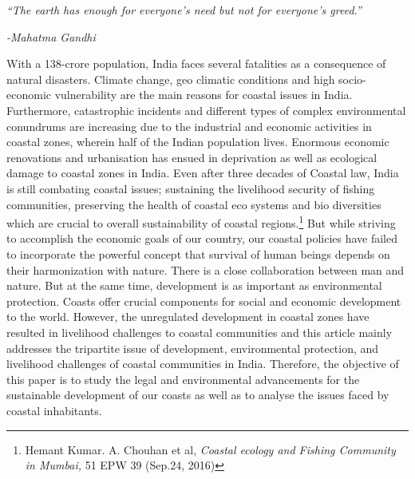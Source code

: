 \setcounter{figure}{0}
\setcounter{table}{0}
\setcounter{footnote}{0}



\begin{multicols}{2}

\noi
\textit{“The earth has enough for everyone’s need but not for everyone’s greed.”}
 
{\hfill\textit{-Mahatma Gandhi}}
 

\noi
With a 138-crore population, India faces several fatalities as a consequence of natural
disasters. Climate change, geo climatic conditions and high socio-economic vulnerability are
the main reasons for coastal issues in India. Furthermore, catastrophic incidents and different
types of complex environmental conundrums are increasing due to the industrial and
economic activities in coastal zones, wherein half of the Indian population lives. Enormous
economic renovations and urbanisation has ensued in deprivation as well as ecological
damage to coastal zones in India. Even after three decades of Coastal law, India is still
combating coastal issues; sustaining the livelihood security of fishing communities,
preserving the health of coastal eco systems and bio diversities which are crucial to overall
sustainability of coastal regions.\footnote{Hemant Kumar. A. Chouhan et al, \textit{Coastal ecology and Fishing Community in Mumbai,} 51 EPW 39 (Sep.24,
2016) } But while striving to accomplish the economic goals of our
country, our coastal policies have failed to incorporate the powerful concept that survival of
human beings depends on their harmonization with nature. There is a close collaboration
between man and nature. But at the same time, development is as important as environmental
protection. Coasts offer crucial components for social and economic development to the
world. However, the unregulated development in coastal zones have resulted in livelihood
challenges to coastal communities and this article mainly addresses the tripartite issue of
development, environmental protection, and livelihood challenges of coastal communities in
India. Therefore, the objective of this paper is to study the legal and environmental
advancements for the sustainable development of our coasts as well as to analyse the issues
faced by coastal inhabitants.


\end{multicols}
